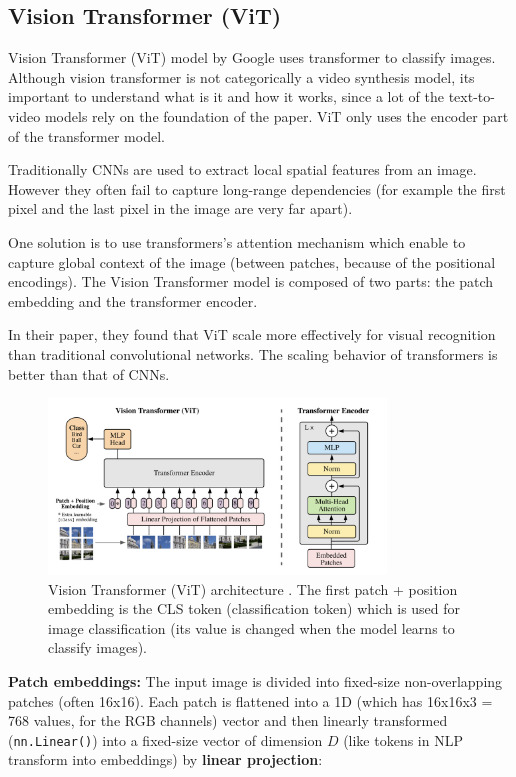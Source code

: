 \subsection{Vision Transformer (ViT)}
\label{appendix:vision_transformer}

Vision Transformer \cite{vision_transformer} (ViT) model by Google uses transformer to classify images. Although vision transformer is not categorically a video synthesis model, its important to understand what is it and how it works, since a lot of the text-to-video models rely on the foundation of the paper. ViT only uses the encoder part of the transformer model.

Traditionally CNNs are used to extract local spatial features from an image. However they often fail to capture long-range dependencies (for example the first pixel and the last pixel in the image are very far apart).

One solution is to use transformers's attention mechanism which enable to capture global context of the image (between patches, because of the positional encodings). The Vision Transformer model is composed of two parts: the patch embedding and the transformer encoder.

In their paper, they found that ViT scale more effectively for visual recognition than traditional convolutional networks. The scaling behavior of transformers is better than that of CNNs.

\begin{figure}
    \centering
    \includegraphics[width=0.8\textwidth]{images/appendix/vision_transformer/architecture.png}
    \caption{Vision Transformer (ViT) architecture \cite{vision_transformer}. The first patch + position embedding is the CLS token (classification token) which is used for image classification (its value is changed when the model learns to classify images).}
\end{figure}

\textbf{Patch embeddings:} The input image is divided into fixed-size non-overlapping patches (often 16x16). Each patch is flattened into a 1D (which has 16x16x3 = 768 values, for the RGB channels) vector and then linearly transformed (\texttt{nn.Linear()}) into a fixed-size vector of dimension $D$ (like tokens in NLP transform into embeddings) by \textbf{linear projection}:

